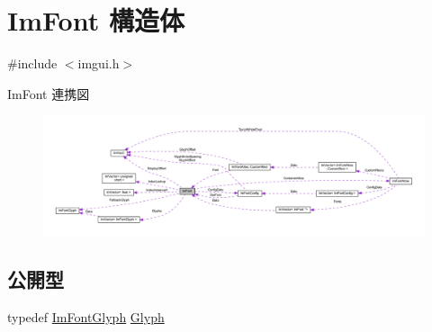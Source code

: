 \hypertarget{struct_im_font}{}\section{Im\+Font 構造体}
\label{struct_im_font}


{\ttfamily \#include $<$imgui.\+h$>$}



Im\+Font 連携図\nopagebreak
\begin{figure}[H]
\begin{center}
\leavevmode
\includegraphics[width=350pt]{struct_im_font__coll__graph}
\end{center}
\end{figure}
\subsection*{公開型}
\begin{DoxyCompactItemize}
\item 
typedef \mbox{\hyperlink{struct_im_font_glyph}{Im\+Font\+Glyph}} \mbox{\hyperlink{struct_im_font_a4b802233ac8d3f3beddc395837288683}{Glyph}}
\end{DoxyCompactItemize}
